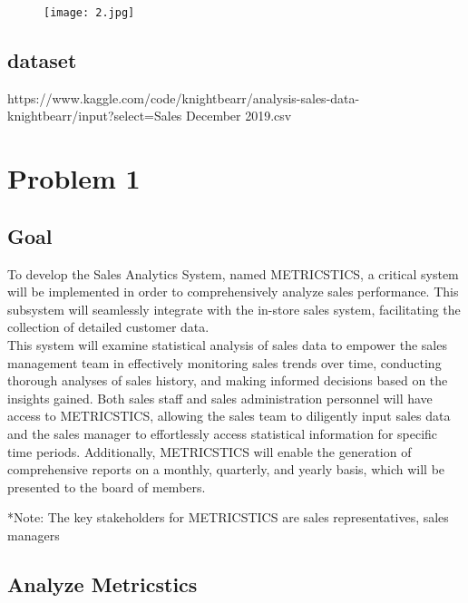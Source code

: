 \documentclass[12pt,letterpaper]{report}
\begin{document}
\begin{figure}[h]
    \begin{center}
    \texttt{[image: 2.jpg]}
    \end{center}
\end{figure}


\section{dataset}

https://www.kaggle.com/code/knightbearr/analysis-sales-data-knightbearr/input?select=Sales December 2019.csv


\chapter{Problem 1}

\section{Goal}

To develop the Sales Analytics System, named METRICSTICS, a critical system will be implemented in order to comprehensively analyze sales performance. This subsystem will seamlessly integrate with the in-store sales system, facilitating the collection of detailed customer data.\\[1\baselineskip]

This system will examine statistical analysis of sales data to empower the sales management team in effectively monitoring sales trends over time, conducting thorough analyses of sales history, and making informed decisions based on the insights gained. Both sales staff and sales administration personnel will have access to METRICSTICS, allowing the sales team to diligently input sales data and the sales manager to effortlessly access statistical information for specific time periods. Additionally, METRICSTICS will enable the generation of comprehensive reports on a monthly, quarterly, and yearly basis, which will be presented to the board of members.		 	 	 	

*Note: The key stakeholders for METRICSTICS are sales representatives, sales managers


\section{Analyze Metricstics}
\end{document}
